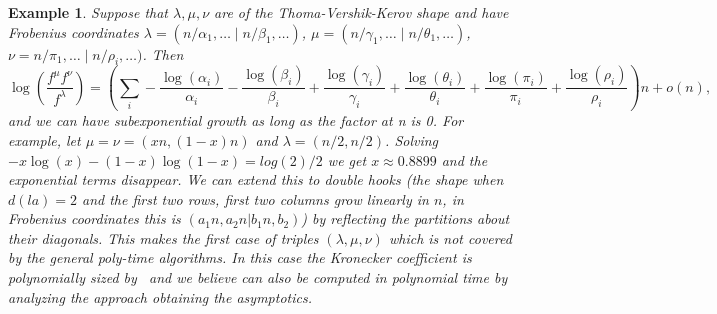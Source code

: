 \documentclass[11pt]{amsart}
\newtheorem{ex}[thm]{Example}
\theoremstyle{plain}
\theoremstyle{definition}
\numberwithin{equation}{section}
\newcommand{\la}{\lambda}
\newcommand{\ga}{\gamma}
\newcommand{\al}{\alpha}
\newcommand{\be}{\beta}
\def\la{\lambda}
\begin{document}
\begin{ex}
Suppose that $\la,\mu,\nu$ are of the Thoma-Vershik-Kerov shape and have Frobenius coordinates $\la=(n/\al_1,\ldots \mid n/\be_1,\ldots)$, $\mu=(n/\ga_1,\ldots \mid n/\theta_1,\ldots)$, $\nu = n/\pi_1,\ldots \mid n/\rho_i, \ldots)$. Then
$$\log\left(\frac{f^\mu f^\nu}{f^\la} \right) = \left( \sum_i -\frac{\log(\al_i)}{\al_i} - \frac{\log(\be_i)}{\be_i}+ \frac{\log(\ga_i)}{\ga_i} + \frac{ \log(\theta_i)}{\theta_i} + \frac{\log(\pi_i)}{\pi_i} + \frac{\log(\rho_i)}{\rho_i} \right)n + o(n), $$
and we can have subexponential growth as long as the factor at n is 0. For example, let $\mu=\nu=(x n,(1-x)n)$ and $\la =(n/2,n/2)$. Solving $-x\log(x) -(1-x)\log(1-x) = log(2)/2$ we get $x\approx 0.8899$ and the exponential terms disappear.  We can extend this to double hooks (the shape when $d(la)=2$ and the first two rows, first two columns grow linearly in $n$, in Frobenius coordinates this is $(a_1n,a_2n|b_1n,b_2)$) by reflecting the partitions about their diagonals. This makes the first case of triples $(\la,\mu,\nu)$ which is not covered by the general poly-time algorithms. In this case the Kronecker coefficient is polynomially sized by~\cite{PP22} and we believe can also be computed in polynomial time by analyzing the approach obtaining the asymptotics. 
\end{ex}
\end{document}
